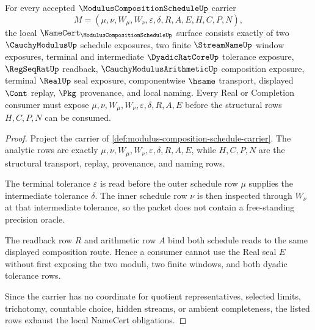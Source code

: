 \begin{theorem}
\label{thm:modulus-composition-schedule-namecert-obligations}
For every accepted $\ModulusCompositionScheduleUp$ carrier
$$
M=(\mu,\nu,W_{\mu},W_{\nu},\varepsilon,\delta,R,A,E,H,C,P,N),
$$
the local $\NameCert_{\ModulusCompositionScheduleUp}$ surface consists exactly of two $\CauchyModulusUp$ schedule exposures, two finite $\StreamNameUp$ window exposures, terminal and intermediate $\DyadicRatCoreUp$ tolerance exposure, $\RegSeqRatUp$ readback, $\CauchyModulusArithmeticUp$ composition exposure, terminal $\RealUp$ seal exposure, componentwise $\hsame$ transport, displayed $\Cont$ replay, $\Pkg$ provenance, and local naming. Every Real or Completion consumer must expose $\mu,\nu,W_{\mu},W_{\nu},\varepsilon,\delta,R,A,E$ before the structural rows $H,C,P,N$ can be consumed.
\end{theorem}
\begin{proof}
Project the carrier of \autoref{def:modulus-composition-schedule-carrier}. The analytic rows are exactly $\mu,\nu,W_{\mu},W_{\nu},\varepsilon,\delta,R,A,E$, while $H,C,P,N$ are the structural transport, replay, provenance, and naming rows.

The terminal tolerance $\varepsilon$ is read before the outer schedule row $\mu$ supplies the intermediate tolerance $\delta$. The inner schedule row $\nu$ is then inspected through $W_{\nu}$ at that intermediate tolerance, so the packet does not contain a free-standing precision oracle.

The readback row $R$ and arithmetic row $A$ bind both schedule reads to the same displayed composition route. Hence a consumer cannot use the Real seal $E$ without first exposing the two moduli, two finite windows, and both dyadic tolerance rows.

Since the carrier has no coordinate for quotient representatives, selected limits, trichotomy, countable choice, hidden streams, or ambient completeness, the listed rows exhaust the local NameCert obligations.
\end{proof}

